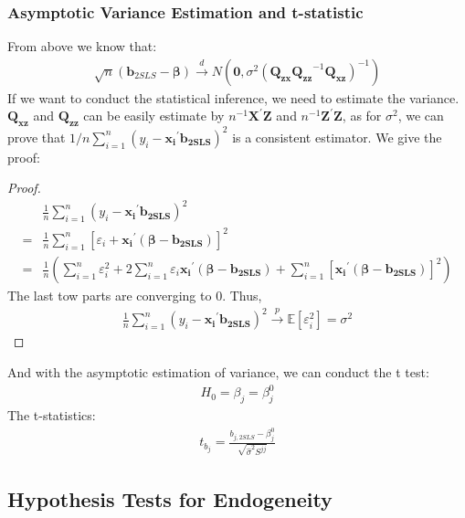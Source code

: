 \documentclass{article}
\begin{document}
\subsubsection{Asymptotic Variance Estimation and t-statistic}
From above we know that:
	\begin{align*}
		\sqrt{n}(\boldsymbol{b}_{2SLS} - \boldsymbol{\beta}) \xrightarrow{d} N(\boldsymbol{0}, \sigma^2 (\boldsymbol{Q_{zx}} \boldsymbol{Q_{zz}}^{-1} \boldsymbol{Q_{xz}})^{-1})
	\end{align*}
If we want to conduct the statistical inference, we need to estimate the variance. $\boldsymbol{Q_{xz}}$ and $\boldsymbol{Q_{zz}}$ can be easily estimate by $n^{-1} \boldsymbol{X}^\prime \boldsymbol{Z}$ and $n^{-1} \boldsymbol{Z}^\prime \boldsymbol{Z}$, as for $\sigma^2$, we can prove that $1/n \sum^n_{i=1} (y_i - \boldsymbol{x_i}^\prime \boldsymbol{b_{2SLS}})^2$ is a consistent estimator. We give the proof:
	\begin{proof}
		\mbox{}\\
			\begin{align*}
				&\frac{1}{n} \sum\limits^n_{i=1} (y_i - \boldsymbol{x_i}^\prime \boldsymbol{b_{2SLS}})^2\\ = &
				\frac{1}{n} \sum\limits^n_{i=1} [\varepsilon_i + \boldsymbol{x_i}^\prime (\boldsymbol{\beta} - \boldsymbol{b_{2SLS}})]^2\\ = &
				\frac{1}{n}(\sum\limits^n_{i=1} \varepsilon^2_i + 2 \sum\limits^n_{i=1} \varepsilon_i \boldsymbol{x_i}^\prime (\boldsymbol{\beta} - \boldsymbol{b_{2SLS}}) + \sum\limits^n_{i=1} [\boldsymbol{x_i}^\prime (\boldsymbol{\beta} - \boldsymbol{b_{2SLS}})]^2)
			\end{align*}
		The last tow parts are converging to 0. Thus,
			\begin{align*}
				\frac{1}{n} \sum\limits^n_{i=1} (y_i - \boldsymbol{x_i}^\prime \boldsymbol{b_{2SLS}})^2 \xrightarrow{p} \mathbb{E}[\varepsilon^2_i] = \sigma^2
			\end{align*}
	\end{proof}
\noindent And with the asymptotic estimation of variance, we can conduct the t test:
	\begin{align*}
		H_0 = \beta_j = \beta^0_j
	\end{align*} 
The t-statistics:
	\begin{align*}
		t_{b_j} = \frac{b_{j, 2SLS} - \beta^0_j}{\sqrt{\hat{\sigma}^2 S^{jj}}}
	\end{align*}




\subsection{Hypothesis Tests for Endogeneity}
\end{document}
